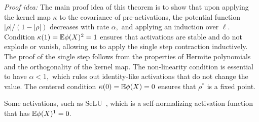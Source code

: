 \textit{Proof idea:} The main proof idea of this theorem is to show that upon applying the kernel map $\kappa$ to the covariance of pre-activations, the potential function $|\rho|/(1-|\rho|)$ decreases with rate $\alpha,$ and applying an induction over $\ell.$ Condition $\kappa(1)=\mathbb{E} \phi(X)^2 = 1$ ensures that activations are stable and do not explode or vanish, allowing us to apply the single step contraction inductively. The proof of the single step follows from the properties of Hermite polynomials and the orthogonality of the kernel map. The non-linearity condition is essential to have $\alpha<1,$ which rules out identity-like activations that do not change the value. The centered condition $\kappa(0)=\mathbb{E} \phi(X) = 0$ ensures that $\rho^*$ is a fixed point.

Some activations, such as SeLU~\citet{klambauer2017self}, which is a self-normalizing activation function that has $\mathbb{E} \phi(X)^1 = 0.$ 



